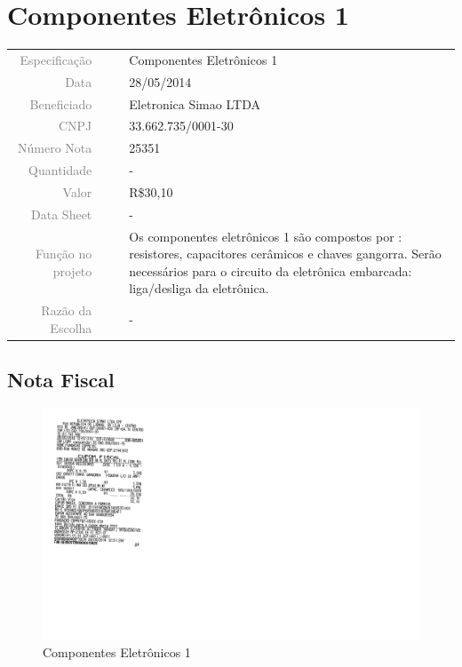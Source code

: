




\section{Componentes Eletrônicos 1}
\label{componentes_1}


\begin{table}[ht!]

	\begin{tabular}{r l|l p{12cm} }
		
		\textcolor{gray}{Especificação} &&& 	{Componentes Eletrônicos 1}\\
		\textcolor{gray}{Data} &&& 				{28/05/2014}\\
        \textcolor{gray}{Beneficiado} &&&		{Eletronica Simao LTDA} \\
        \textcolor{gray}{CNPJ} &&& 				{33.662.735/0001-30} \\
        \textcolor{gray}{Número Nota} &&& 		{25351} \\
		\textcolor{gray}{Quantidade} &&& 		{-} \\
		\textcolor{gray}{Valor} &&& 			{R\$30,10} \\
		\textcolor{gray}{Data Sheet} &&& 		{-} \\

		\textcolor{gray}{Função no projeto} &&& {Os componentes eletrônicos 1 são
		compostos por : resistores, capacitores cerâmicos e chaves gangorra. Serão
		necessários para o circuito da eletrônica embarcada: liga/desliga da
		eletrônica.}
		\\
		\textcolor{gray}{Razão da Escolha} &&& {-}

	\end{tabular}
\end{table}

\newpage

\subsection{Nota Fiscal}
\begin{figure}[h!]
 \centering
 \includegraphics[width=1\columnwidth]{Componentes_Eletronicos_1/nota_eletronica1.png}
 \caption{Componentes Eletrônicos 1} 
 \end{figure}
